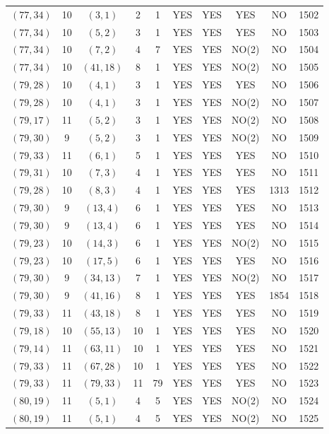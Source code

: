 \begin{longtable}{|c|c|c|c|c|c|c|c|c|c|}
$(77, 34)$ & 10 & $(3, 1)$ & 2 & 1 & YES & YES & YES & NO & 1502\\
$(77, 34)$ & 10 & $(5, 2)$ & 3 & 1 & YES & YES & YES & NO & 1503\\
$(77, 34)$ & 10 & $(7, 2)$ & 4 & 7 & YES & YES & NO(2) & NO & 1504\\
$(77, 34)$ & 10 & $(41, 18)$ & 8 & 1 & YES & YES & NO(2) & NO & 1505\\
$(79, 28)$ & 10 & $(4, 1)$ & 3 & 1 & YES & YES & YES & NO & 1506\\
$(79, 28)$ & 10 & $(4, 1)$ & 3 & 1 & YES & YES & NO(2) & NO & 1507\\
$(79, 17)$ & 11 & $(5, 2)$ & 3 & 1 & YES & YES & NO(2) & NO & 1508\\
$(79, 30)$ & 9 & $(5, 2)$ & 3 & 1 & YES & YES & NO(2) & NO & 1509\\
$(79, 33)$ & 11 & $(6, 1)$ & 5 & 1 & YES & YES & YES & NO & 1510\\
$(79, 31)$ & 10 & $(7, 3)$ & 4 & 1 & YES & YES & YES & NO & 1511\\
$(79, 28)$ & 10 & $(8, 3)$ & 4 & 1 & YES & YES & YES & 1313 & 1512\\
$(79, 30)$ & 9 & $(13, 4)$ & 6 & 1 & YES & YES & YES & NO & 1513\\
$(79, 30)$ & 9 & $(13, 4)$ & 6 & 1 & YES & YES & YES & NO & 1514\\
$(79, 23)$ & 10 & $(14, 3)$ & 6 & 1 & YES & YES & NO(2) & NO & 1515\\
$(79, 23)$ & 10 & $(17, 5)$ & 6 & 1 & YES & YES & YES & NO & 1516\\
$(79, 30)$ & 9 & $(34, 13)$ & 7 & 1 & YES & YES & NO(2) & NO & 1517\\
$(79, 30)$ & 9 & $(41, 16)$ & 8 & 1 & YES & YES & YES & 1854 & 1518\\
$(79, 33)$ & 11 & $(43, 18)$ & 8 & 1 & YES & YES & YES & NO & 1519\\
$(79, 18)$ & 10 & $(55, 13)$ & 10 & 1 & YES & YES & YES & NO & 1520\\
$(79, 14)$ & 11 & $(63, 11)$ & 10 & 1 & YES & YES & YES & NO & 1521\\
$(79, 33)$ & 11 & $(67, 28)$ & 10 & 1 & YES & YES & YES & NO & 1522\\
$(79, 33)$ & 11 & $(79, 33)$ & 11 & 79 & YES & YES & YES & NO & 1523\\
$(80, 19)$ & 11 & $(5, 1)$ & 4 & 5 & YES & YES & NO(2) & NO & 1524\\
$(80, 19)$ & 11 & $(5, 1)$ & 4 & 5 & YES & YES & NO(2) & NO & 1525\\

\end{longtable}
